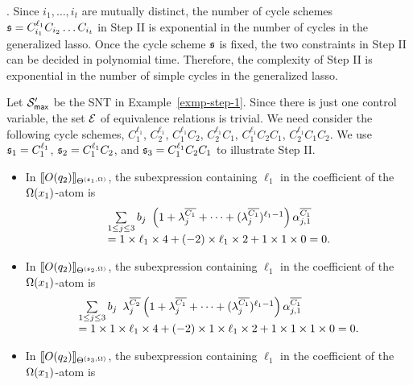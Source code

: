. Since $i_1,\dots, i_t$ are mutually distinct, the number of cycle schemes ${\mathfrak{s} } = C_{i_1}^{\ell_1} C_{i_2} \dots C_{i_t}$ in Step II is exponential in the number of cycles in the generalized lasso. Once the cycle scheme ${\mathfrak{s} }$ is fixed, the two constraints in Step II can be decided in polynomial time. Therefore, the complexity of Step II is exponential in the number of simple cycles in the generalized lasso.



\begin{example}\label{exmp-step-2}
Let ${\mathcal{S} }'_{\sf max}$ be the SNT in Example~\ref{exmp-step-1}. Since there is just one control variable, the set ${\mathcal{E} }$ of equivalence relations is trivial. We need consider the following cycle schemes, $C^{\ell_1}_1$, $C^{\ell_1}_2$, $C^{\ell_1}_1 C_2$, $C^{\ell_1}_2 C_1$, $C^{\ell_1}_1 C_2 C_1$, $C^{\ell_1}_2 C_1 C_2$. We use ${\mathfrak{s} }_1 = C^{\ell_1}_1$, ${\mathfrak{s} }_2 = C^{\ell_1}_1 C_2$, and ${\mathfrak{s} }_3 = C^{\ell_1}_1 C_2 C_1$ to illustrate Step II.
\begin{itemize}
\item In $\llbracket O(q_2)\rrbracket_{\Theta^{({\mathfrak{s} }_1, \Omega)}}$,  the subexpression containing $\ell_1$ in the coefficient of the $\Omega(x_1)$-atom is
\[
\begin{array} {l}
\sum \limits_{1 \le j \le 3} b_j
\begin{array}{l}
\left(1+\lambda^{\overline{C_{1}}}_{j} + \dots + (\lambda^{\overline{C_{1}}}_{j})^{\ell_1-1} \right) \alpha^{\overline{C_{1}}}_{j, 1}
\end{array}
\\
= 1 \times \ell_1 \times 4 +  (-2) \times \ell_1 \times 2 + 1 \times 1 \times 0 = 0.
\end{array}
\]
%
\item In $\llbracket O(q_2)\rrbracket_{\Theta^{({\mathfrak{s} }_2, \Omega)}}$, the subexpression containing $\ell_1$ in the coefficient of the $\Omega(x_1)$-atom is 
\[
\begin{array}{l}
\sum \limits_{1 \le j \le 3} b_j
\begin{array}{l}
 \lambda^{\overline{C_{2}}}_{j}
\left(1+\lambda^{\overline{C_{1}}}_{j} + \dots + (\lambda^{\overline{C_{1}}}_{j})^{\ell_1-1} \right) \alpha^{\overline{C_{1}}}_{j, 1}
\end{array}
\\
= 1 \times 1 \times \ell_1 \times 4 + (-2) \times 1 \times \ell_1 \times 2 + 1 \times 1 \times 1 \times 0 =0.
\end{array}
\]
%
\item In $\llbracket O(q_2)\rrbracket_{\Theta^{({\mathfrak{s} }_3, \Omega)}}$, the subexpression containing $\ell_1$ in the coefficient of the $\Omega(x_1)$-atom is 

\end{itemize}
\end{example}
